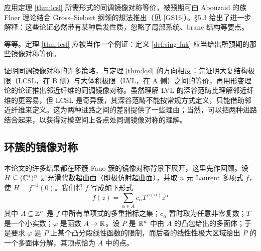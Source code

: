 
应用定理 \ref{thm:lcsl} 所需形式的同调镜像对称等价，被预期可由 Abouzaid 的族 Floer 理论结合 Gross–Siebert 纲领的想法推出（见 [GS16]）。§5.3 给出了进一步解释：这些论证必然带有某种启发性质，忽略了局部系统、brane 结构等要点。

等等。定理 \ref{thm:lcsl} 应被当作一个例证：定义 \ref{def:sing-fuk} 应当给出所预期的那些镜像对称等价。

\begin{remarkx}\label{rem:lvl-direction}
证明同调镜像对称的许多策略，与定理 \ref{thm:lcsl} 的方向相反：先证明大复结构极限（LCSL，在 B 侧）与大体积极限（LVL，在 A 侧）之间的等价，再用形变理论的论证推出邻近纤维的同调镜像对称。虽然理解 LVL 的深谷范畴比理解邻近纤维的更容易，但 LCSL 是奇异簇，其深谷范畴不能按常规方式定义，只能借助邻近纤维来定义。这为两种进路之间的差别提供了一些理由；当然，可以把两种进路结合起来，以获得对模空间上各点处同调镜像对称的理解。
\end{remarkx}


\subsection{环簇的镜像对称}

本论文的许多结果都在环簇 Fano 簇的镜像对称背景下展开，这里先作回顾。设 $H\subseteq(\mathbb{C}^*)^n$ 是光滑代数超曲面（即极仿射超曲面），并取 $n$ 元 Laurent 多项式 $f$，使 $H=f^{-1}(0)$。我们将 $f$ 写成如下形式
\[
f(z)=\sum_{\alpha\in A}c_\alpha T^{\varphi(\alpha)}z^\alpha
\]
其中 $A\subseteq\mathbb{Z}^n$ 是 $f$ 中所有单项式的多重指标之集；$c_\alpha$ 暂时取为任意非零复数；$T$ 是一个小实数；$\varphi$ 是函数 $A\to\mathbb{R}$。设 $P$ 是 $\mathbb{R}^n$ 中由 $A$ 的凸包给出的多面体；于是要求 $\varphi$ 是 $P$ 上某个凸分段线性函数的限制，而后者的线性性极大区域给出 $P$ 的一个多面体分解，其顶点恰为 $A$ 中的点。


